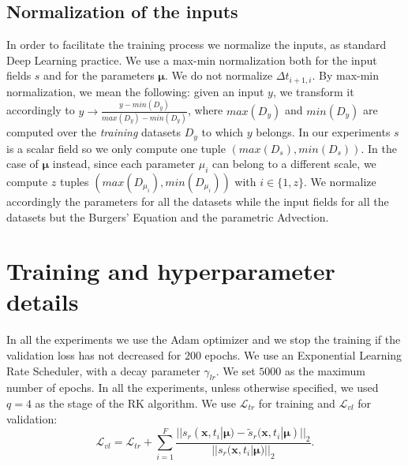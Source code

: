 \subsection{Normalization of the inputs}
\label{subsec:normalization}
In order to facilitate the training process we normalize the inputs, as standard Deep Learning practice. We use a max-min normalization both for the input fields $s$ and for the parameters $\pmb{\mu}$. We do not normalize $\Delta t_{i+1,i}$. By max-min normalization, we mean the following: given an input $y$, we transform it accordingly to $y\rightarrow \frac{y-min(D_y)}{max(D_y)-min(D_y)}$, where $max(D_y)$ and $min(D_y)$ are computed over the \textit{training} datasets $D_y$ to which $y$ belongs. In our experiments $s$ is a scalar field so we only compute one tuple $(max(D_s),min(D_s))$. In the case of $\pmb{\mu}$ instead, since each parameter $\mu_i$ can belong to a different scale, we compute $z$ tuples $(max(D_{\mu_i}),min(D_{\mu_i}))$ with $i\in\{1,z\}$. We normalize accordingly the parameters for all the datasets while the input fields for all the datasets but the Burgers' Equation and the parametric Advection.

\section{Training and hyperparameter details}
\label{subsec:training_details}
In all the experiments we use the Adam optimizer \cite{adam} and we stop the training if the validation loss has not decreased for $200$ epochs. We use an Exponential Learning Rate Scheduler, with a decay parameter $\gamma_{lr}$. We set $5000$ as the maximum number of epochs. In all the experiments, unless otherwise specified, we used $q=4$ as the stage of the RK algorithm.  We use $\mathcal{L}_{tr}$ for training and $\mathcal{L}_{vl}$ for validation:
\begin{equation}
    \mathcal{L}_{vl} = \mathcal{L}_{tr} + \sum_{i=1}^{F} \frac{||s_r(\mathbf{x},t_i|\pmb{\mu}) - \tilde{s}_r(\mathbf{x},t_i|\pmb{\mu})||_2}{||s_r(\mathbf{x},t_i|\pmb{\mu})||_2}.
\end{equation}
